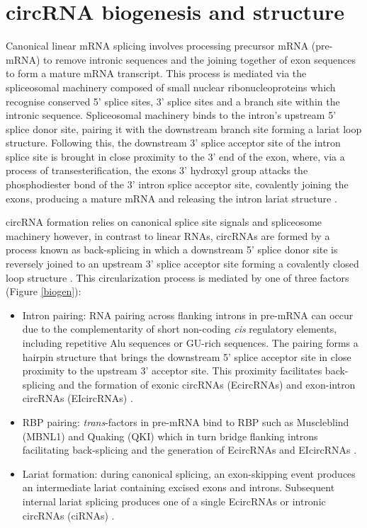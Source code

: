 \documentclass[journal,review,submit,pdftex,moreauthors]{Definitions/mdpi}
\begin{document}
\section{circRNA biogenesis and structure}
Canonical linear mRNA splicing involves processing precursor mRNA (pre-mRNA) to remove intronic sequences and the joining together of exon sequences to form a mature mRNA transcript. This process is mediated via the spliceosomal machinery composed of small nuclear ribonucleoproteins which recognise conserved 5' splice sites,  3' splice sites and a branch site within the intronic sequence. Spliceosomal machinery binds to the intron's upstream 5' splice donor site, pairing it with the downstream branch site forming a lariat loop structure. Following this, the downstream 3' splice acceptor site of the intron splice site is brought in close proximity to the 3' end of the exon, where, via a process of transesterification, the exons 3' hydroxyl group attacks the phosphodiester bond of the 3' intron splice acceptor site, covalently joining the exons, producing a mature mRNA and releasing the intron lariat structure \cite{BibEntry2019Dec}. \par

circRNA formation relies on canonical splice site signals and spliceosome machinery \cite{Starke2015Jan} however, in contrast to linear RNAs, circRNAs are formed by a process known as back-splicing in which a downstream 5' splice donor site is reversely joined to an upstream 3' splice acceptor site forming a covalently closed loop structure \cite{Jeck2012Dec, Jeck2014May}. This circularization process is mediated by one of three factors (Figure \ref{biogen}):
\begin{itemize}
    \item Intron pairing: RNA pairing across flanking introns in pre-mRNA can occur due to the complementarity of short non-coding \textit{cis} regulatory elements, including repetitive Alu sequences or GU-rich sequences. The pairing forms a hairpin structure that brings the downstream 5' splice acceptor site in close proximity to the upstream 3' acceptor site. This proximity facilitates back-splicing and the formation of exonic circRNAs (EcircRNAs) and exon-intron circRNAs (EIcircRNAs) \cite{Wilusz2015May, Zhang2014Sep}.
    \item RBP pairing: \textit{trans}-factors in pre-mRNA bind to RBP such as Muscleblind (MBNL1) and Quaking (QKI) which in turn bridge flanking introns facilitating back-splicing and the generation of EcircRNAs and EIcircRNAs \cite{Singh2022Jan, Chen2015Apr}.
    \item  Lariat formation: during canonical splicing, an exon-skipping event produces an intermediate lariat containing excised exons and introns. Subsequent internal lariat splicing produces one of a single EcircRNAs \cite{Zaphiropoulos1996} or intronic circRNAs (ciRNAs) \cite{ZHANG2013}.
\end{itemize}
\end{document}
